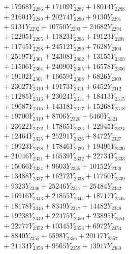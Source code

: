 \documentclass[a4paper,10pt]{article}
\begin{document}
{\begin{align}
&\;  + 17968 Y_{2286} + 17109 Y_{2287} + 18014 Y_{2288} \\[0.3ex]
&\;  + 21604 Y_{2289} + 20274 Y_{2290} + 9130 Y_{2291} \\[0.3ex]
&\;  + 9131 Y_{2292} + 10750 Y_{2293} + 24682 Y_{2294} \\[0.3ex]
&\;  + 12205 Y_{2295} + 11823 Y_{2296} + 19123 Y_{2297} \\[0.3ex]
&\;  + 11745 Y_{2298} + 24512 Y_{2299} + 7628 Y_{2300} \\[0.3ex]
&\;  + 25197 Y_{2301} + 24308 Y_{2302} + 13155 Y_{2303} \\[0.3ex]
&\;  + 11506 Y_{2304} + 24090 Y_{2305} + 16578 Y_{2306} \\[0.3ex]
&\;  + 19102 Y_{2307} + 16659 Y_{2308} + 6826 Y_{2309} \\[0.5ex]\allowbreak
&\;  + 23027 Y_{2310} + 19173 Y_{2311} + 6452 Y_{2312} \\[0.3ex]
&\;  + 11285 Y_{2313} + 23024 Y_{2314} + 18413 Y_{2315} \\[0.3ex]
&\;  + 19687 Y_{2316} + 14318 Y_{2317} + 15268 Y_{2318} \\[0.3ex]
&\;  + 19700 Y_{2319} + 8706 Y_{2320} + 6460 Y_{2321} \\[0.3ex]
&\;  + 23622 Y_{2322} + 17865 Y_{2323} + 22945 Y_{2324} \\[0.3ex]
&\;  + 12464 Y_{2325} + 25291 Y_{2326} + 8472 Y_{2327} \\[0.3ex]
&\;  + 19923 Y_{2328} + 17846 Y_{2329} + 19496 Y_{2330} \\[0.3ex]
&\;  + 21046 Y_{2331} + 16539 Y_{2332} + 22734 Y_{2333} \\[0.3ex]
&\;  + 15066 Y_{2334} + 9603 Y_{2335} + 10152 Y_{2336} \\[0.3ex]
&\;  + 13488 Y_{2337} + 16272 Y_{2338} + 17750 Y_{2339} \\[0.5ex]\allowbreak
&\;  + 9323 Y_{2340} + 25246 Y_{2341} + 25484 Y_{2342} \\[0.3ex]
&\;  + 16916 Y_{2343} + 21855 Y_{2344} + 18717 Y_{2345} \\[0.3ex]
&\;  + 18178 Y_{2346} + 8349 Y_{2347} + 14482 Y_{2348} \\[0.3ex]
&\;  + 19238 Y_{2349} + 22475 Y_{2350} + 23895 Y_{2351} \\[0.3ex]
&\;  + 22777 Y_{2352} + 10345 Y_{2353} + 6972 Y_{2354} \\[0.3ex]
&\;  + 8840 Y_{2355} + 6598 Y_{2356} + 20117 Y_{2357} \\[0.3ex]
&\;  + 21134 Y_{2358} + 9565 Y_{2359} + 13917 Y_{2360} \\[0.3ex]

\end{align}}
\end{document}
